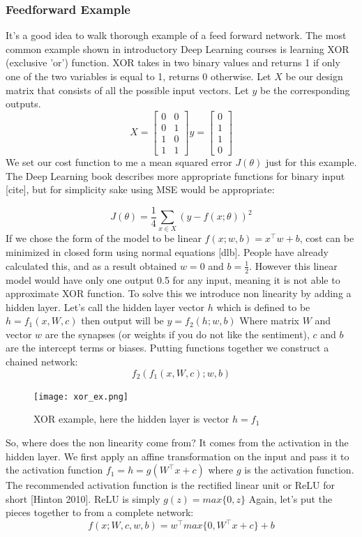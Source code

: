 \documentclass[paper=a4, fontsize=11pt]{scrartcl}
\numberwithin{equation}{section}		%
\numberwithin{figure}{section}			%
\numberwithin{table}{section}			%
\begin{document}
	\subsubsection{Feedforward Example}
	It's a good idea to walk thorough example of a feed forward network. The most common example shown in introductory Deep Learning courses is learning XOR (exclusive 'or') function. XOR takes in two binary values and returns 1 if only one of the two variables is equal to 1, returns 0 otherwise.
	Let $X$ be our design matrix that consists of all the possible input vectors. Let $y$ be the corresponding outputs. 
		$$ X = 
		\begin{bmatrix}
			0 & 0 \\
			0 & 1 \\
			1 & 0 \\
			1 & 1
		\end{bmatrix} 
		y = 
		\begin{bmatrix}
		0 \\
		1 \\
		1 \\
		0 
		\end{bmatrix}$$
	We set our cost function to me a mean squared error $J(\theta)$ just for this example. The Deep Learning book describes more appropriate functions for binary input [cite], but for simplicity sake using MSE would be appropriate:
	
		$$ J(\theta)=\frac{1}{4}\sum_{x\in X}^{}(y-f(x;\theta))^2 $$
	If we chose the form of the model to be linear $ f(x;w,b)=x^\top w + b $, cost can be minimized in closed form using normal equations [dlb]. People have already calculated this, and as a result obtained $ w = 0 $ and $ b = \frac{1}{2}$. However this linear model would have only one output 0.5 for any input, meaning it is not able to approximate XOR function. To solve this we introduce non linearity by adding a hidden layer. Let's call the hidden layer vector $h$ which is defined to be $ h = f_1(x,W,c) $ then output will be $ y = f_2(h;w,b)$ Where matrix $W$ and vector $w$ are the synapses (or weights if you do not like the sentiment), $c$ and $b$ are the intercept terms or biases. Putting functions together we construct a chained network:
		$$ f_2(f_1(x,W,c);w,b) $$
	
	
	
	\begin{figure}[!htb]
		\centering
		\texttt{[image: xor\_ex.png]}
		\caption{XOR example, here the hidden layer is vector $ h = f_1 $}
		\label{fig:cifar}
	\end{figure}
	So, where does the non linearity come from? It comes from the activation in the hidden layer.
	We first apply an affine transformation on the input and pass it to the activation function $ f_1 = h = g(W^\top x + c)$ where $g$ is the activation function. The recommended activation function is the rectified linear unit or ReLU for short [Hinton 2010]. ReLU is simply $ g(z) = max\{0,z\} $
	Again, let's put the pieces together to from a complete network:
	$$ f(x; W,c,w,b) = w^\top max\{0,W^\top x + c\} + b $$
	
\end{document}
